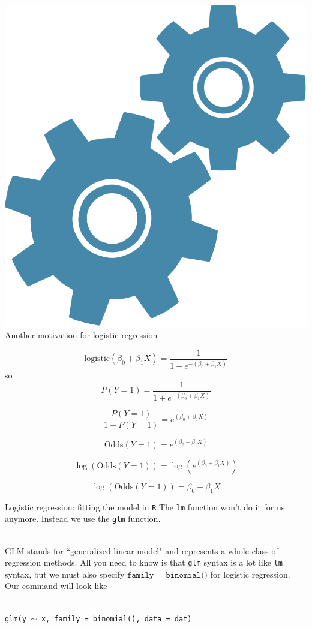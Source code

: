 \documentclass[10pt,t]{beamer}
\begin{document}
\begin{frame}{\includegraphics[scale = 0.015]{figs/technical} Another motivation for logistic regression}
	
	\vspace{-5 mm}

	\centering
	\[\text{logistic}(\beta_0+\beta_1X)=\frac{1}{1+e^{-(\beta_0+\beta_1X)}}\]
	so
	\[P(Y=1)=\frac{1}{1+e^{-(\beta_0+\beta_1X)}}\]
	
	\[\frac{P(Y=1)}{1-P(Y=1)}=e^{(\beta_0+\beta_1X)}\]
	
	\[\text{Odds}(Y=1)=e^{(\beta_0+\beta_1X)}\]
	
	\[\log(\text{Odds}(Y=1))=\log(e^{(\beta_0+\beta_1X)})\]
	
	\[\log(\text{Odds}(Y=1))=\beta_0+\beta_1X\]
	
\end{frame}

\begin{frame}{Logistic regression: fitting the model in \texttt{R}}
	The \texttt{lm} function won't do it for us anymore. Instead we use the \texttt{glm} function. 
	\\ ~\ 
	
	GLM stands for ``generalized linear model" and represents a whole class of regression methods. All you need to know is that \texttt{glm} syntax is a lot like \texttt{lm} syntax, but we must also specify $\texttt{family = binomial()}$ for logistic regression. Our command will look like
	\\ ~\
	
	\texttt{glm(y $\sim$ x, family = binomial(), data = dat)}
\end{frame}
\end{document}
